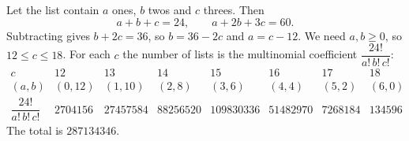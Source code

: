 Let the list contain $a$ ones, $b$ twos and $c$ threes. Then
\[a+b+c=24,\qquad a+2b+3c=60.\]
Subtracting gives $b+2c=36$, so $b=36-2c$ and $a=c-12$. We need $a,b\ge0$, so $12\le c\le18$. For each $c$ the number of lists is the multinomial coefficient $\dfrac{24!}{a!\,b!\,c!}$:
\[\begin{array}{c|ccccccc}
c&12&13&14&15&16&17&18\\\hline
(a,b)&(0,12)&(1,10)&(2,8)&(3,6)&(4,4)&(5,2)&(6,0)\\\hline
\dfrac{24!}{a!\,b!\,c!}&2704156&27457584&88256520&109830336&51482970&7268184&134596
\end{array}\]
The total is $\boxed{287134346}$.
